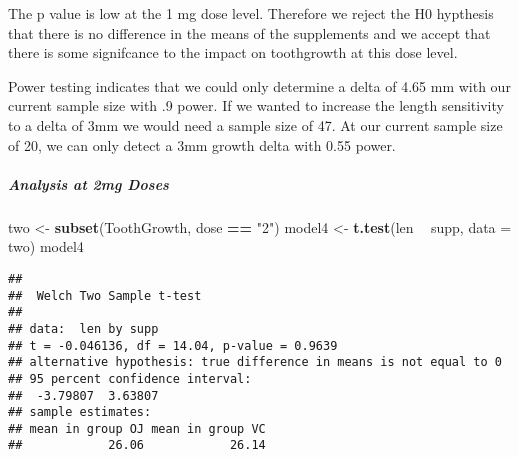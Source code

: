 \documentclass[]{article}
\newenvironment{Shaded}{\begin{snugshade}}{\end{snugshade}}
\newcommand{\DataTypeTok}[1]{\textcolor[rgb]{0.13,0.29,0.53}{#1}}
\newcommand{\DecValTok}[1]{\textcolor[rgb]{0.00,0.00,0.81}{#1}}
\newcommand{\FloatTok}[1]{\textcolor[rgb]{0.00,0.00,0.81}{#1}}
\newcommand{\KeywordTok}[1]{\textcolor[rgb]{0.13,0.29,0.53}{\textbf{#1}}}
\newcommand{\NormalTok}[1]{#1}
\newcommand{\OperatorTok}[1]{\textcolor[rgb]{0.81,0.36,0.00}{\textbf{#1}}}
\newcommand{\StringTok}[1]{\textcolor[rgb]{0.31,0.60,0.02}{#1}}
\let\oldsubparagraph\subparagraph
\renewcommand{\subparagraph}[1]{\oldsubparagraph{#1}\mbox{}}
\begin{document}
The p value is low at the 1 mg dose level. Therefore we reject the H0
hypthesis that there is no difference in the means of the supplements
and we accept that there is some signifcance to the impact on
toothgrowth at this dose level.

Power testing indicates that we could only determine a delta of 4.65 mm
with our current sample size with .9 power. If we wanted to increase the
length sensitivity to a delta of 3mm we would need a sample size of 47.
At our current sample size of 20, we can only detect a 3mm growth delta
with 0.55 power.

\hypertarget{analysis-at-2mg-doses}{%
\subparagraph{Analysis at 2mg Doses}\label{analysis-at-2mg-doses}}

\begin{Shaded}
\begin{Highlighting}[]
\NormalTok{two <-}\StringTok{ }\KeywordTok{subset}\NormalTok{(ToothGrowth, dose }\OperatorTok{==}\StringTok{ "2"}\NormalTok{)}
\NormalTok{model4 <-}\StringTok{ }\KeywordTok{t.test}\NormalTok{(len }\OperatorTok{~}\StringTok{ }\NormalTok{supp, }\DataTypeTok{data =}\NormalTok{ two)}
\NormalTok{model4}
\end{Highlighting}
\end{Shaded}

\begin{verbatim}
## 
##  Welch Two Sample t-test
## 
## data:  len by supp
## t = -0.046136, df = 14.04, p-value = 0.9639
## alternative hypothesis: true difference in means is not equal to 0
## 95 percent confidence interval:
##  -3.79807  3.63807
## sample estimates:
## mean in group OJ mean in group VC 
##            26.06            26.14
\end{verbatim}

\begin{Shaded}
\end{Shaded}
\end{document}
